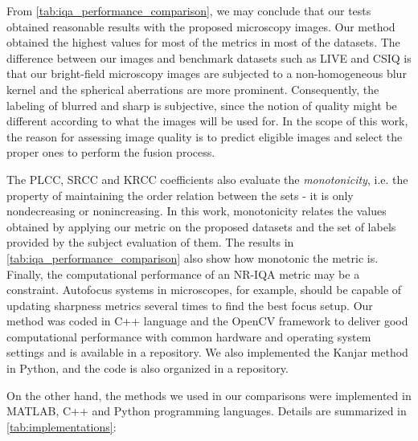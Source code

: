 From \autoref{tab:iqa_performance_comparison}, we may conclude that our tests obtained reasonable results with the proposed microscopy images. Our method obtained the highest values for most of the metrics in most of the datasets.  The difference between our images and benchmark datasets such as LIVE \cite{sheikh2006statistical} and CSIQ \cite{larson2010most} is that our bright-field microscopy images are subjected to a non-homogeneous blur kernel and the spherical aberrations are more prominent. Consequently, the labeling of blurred and sharp is subjective, since the notion of quality might be different according to what the images will be used for. In the scope of this work, the reason for assessing image quality is to predict eligible images and select the proper ones to perform the fusion process.

The PLCC, SRCC and KRCC coefficients also evaluate the \textit{monotonicity}, i.e. the property of maintaining the order relation between the sets - it is only nondecreasing or nonincreasing. In this work, monotonicity relates the values obtained by applying our metric on the proposed datasets and the set of labels provided by the subject evaluation of them. The results in \autoref{tab:iqa_performance_comparison} also show how monotonic the metric is. Finally, the computational performance of an NR-IQA metric may be a constraint. Autofocus systems in microscopes, for example, should be capable of updating sharpness metrics several times to find the best focus setup. Our method was coded in C++ language and the OpenCV framework to deliver good computational performance with common hardware and operating system settings and is available in a repository. We also implemented the Kanjar method in Python, and the code is also organized in a repository. 



On the other hand, the methods we used in our comparisons were implemented in MATLAB, C++ and Python programming languages. Details are summarized in \autoref{tab:implementations}:

